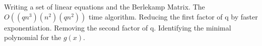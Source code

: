 
\noindent

Writing a set of linear equations and the Berlekamp Matrix. The $O((qn^3)(n^2)(qn^2))$ time algorithm. Reducing the first factor of q by faster exponentiation. Removing the second factor of q. Identifying the minimal polynomial for the $g(x)$.
